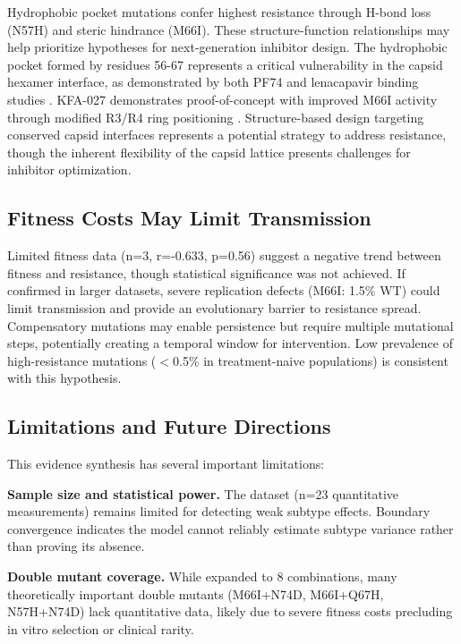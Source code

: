 \documentclass[preprint]{elsarticle}
\begin{document}
Hydrophobic pocket mutations confer highest resistance through H-bond loss (N57H) and steric hindrance (M66I). These structure-function relationships may help prioritize hypotheses for next-generation inhibitor design. The hydrophobic pocket formed by residues 56-67 represents a critical vulnerability in the capsid hexamer interface, as demonstrated by both PF74 and lenacapavir binding studies \cite{Blair2010,Rankovic2018}. KFA-027 demonstrates proof-of-concept with improved M66I activity through modified R3/R4 ring positioning \cite{Yant2022}. Structure-based design targeting conserved capsid interfaces represents a potential strategy to address resistance, though the inherent flexibility of the capsid lattice \cite{Mattei2016} presents challenges for inhibitor optimization.

\subsection{Fitness Costs May Limit Transmission}

Limited fitness data (n=3, r=-0.633, p=0.56) suggest a negative trend between fitness and resistance, though statistical significance was not achieved. If confirmed in larger datasets, severe replication defects (M66I: 1.5\% WT) could limit transmission and provide an evolutionary barrier to resistance spread. Compensatory mutations may enable persistence but require multiple mutational steps, potentially creating a temporal window for intervention. Low prevalence of high-resistance mutations ($<$0.5\% in treatment-naive populations) \cite{Andreatta2024} is consistent with this hypothesis.

\subsection{Limitations and Future Directions}

This evidence synthesis has several important limitations:

\textbf{Sample size and statistical power.} The dataset (n=23 quantitative measurements) remains limited for detecting weak subtype effects. Boundary convergence indicates the model cannot reliably estimate subtype variance rather than proving its absence.

\textbf{Double mutant coverage.} While expanded to 8 combinations, many theoretically important double mutants (M66I+N74D, M66I+Q67H, N57H+N74D) lack quantitative data, likely due to severe fitness costs precluding in vitro selection or clinical rarity.
\end{document}
